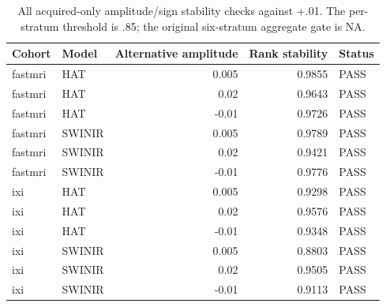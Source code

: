 \begin{table}[t]\centering\small\caption{All acquired-only amplitude/sign stability checks against +.01. The per-stratum threshold is .85; the original six-stratum aggregate gate is NA.}\begin{tabular}{llrrl}\toprule Cohort & Model & Alternative amplitude & Rank stability & Status\\\midrule
fastmri & HAT & 0.005 & 0.9855 & PASS \\
fastmri & HAT & 0.02 & 0.9643 & PASS \\
fastmri & HAT & -0.01 & 0.9726 & PASS \\
fastmri & SWINIR & 0.005 & 0.9789 & PASS \\
fastmri & SWINIR & 0.02 & 0.9421 & PASS \\
fastmri & SWINIR & -0.01 & 0.9776 & PASS \\
ixi & HAT & 0.005 & 0.9298 & PASS \\
ixi & HAT & 0.02 & 0.9576 & PASS \\
ixi & HAT & -0.01 & 0.9348 & PASS \\
ixi & SWINIR & 0.005 & 0.8803 & PASS \\
ixi & SWINIR & 0.02 & 0.9505 & PASS \\
ixi & SWINIR & -0.01 & 0.9113 & PASS \\
\bottomrule\end{tabular}\end{table}